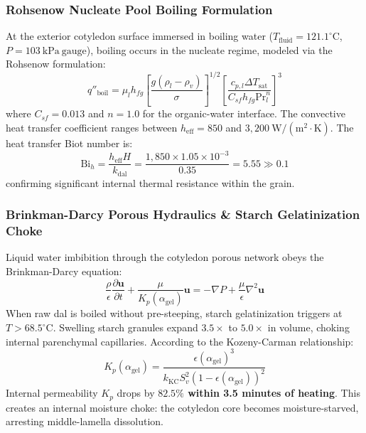 \documentclass[10pt,a4paper]{article}
\begin{document}
\subsubsection{Rohsenow Nucleate Pool Boiling Formulation}
At the exterior cotyledon surface immersed in boiling water ($T_{\mathrm{fluid}} = 121.1^\circ\mathrm{C}$, $P = 103\ \mathrm{kPa\ gauge}$), boiling occurs in the nucleate regime, modeled via the Rohsenow formulation:
\begin{equation}
q''_{\mathrm{boil}} = \mu_l h_{fg} \left[ \frac{g (\rho_l - \rho_v)}{\sigma} \right]^{1/2} \left[ \frac{c_{p,l} \Delta T_{\mathrm{sat}}}{C_{sf} h_{fg} \mathrm{Pr}_l^n} \right]^3
\end{equation}
where $C_{sf} = 0.013$ and $n = 1.0$ for the organic-water interface. The convective heat transfer coefficient ranges between $h_{\mathrm{eff}} = 850$ and $3,200\ \mathrm{W/(m^2 \cdot K)}$. The heat transfer Biot number is:
\begin{equation}
\mathrm{Bi}_h = \frac{h_{\mathrm{eff}} H}{k_{\mathrm{dal}}} = \frac{1,850 \times 1.05 \times 10^{-3}}{0.35} = 5.55 \gg 0.1
\end{equation}
confirming significant internal thermal resistance within the grain.

\subsubsection{Brinkman-Darcy Porous Hydraulics \& Starch Gelatinization Choke}
Liquid water imbibition through the cotyledon porous network obeys the Brinkman-Darcy equation:
\begin{equation}
\frac{\rho}{\epsilon} \frac{\partial \mathbf{u}}{\partial t} + \frac{\mu}{K_p(\alpha_{\mathrm{gel}})} \mathbf{u} = - \nabla P + \frac{\mu}{\epsilon} \nabla^2 \mathbf{u}
\end{equation}
When raw dal is boiled without pre-steeping, starch gelatinization triggers at $T > 68.5^\circ\mathrm{C}$. Swelling starch granules expand $3.5\times$ to $5.0\times$ in volume, choking internal parenchymal capillaries. According to the Kozeny-Carman relationship:
\begin{equation}
K_p(\alpha_{\mathrm{gel}}) = \frac{\epsilon(\alpha_{\mathrm{gel}})^3}{k_{\mathrm{KC}} S_v^2 (1 - \epsilon(\alpha_{\mathrm{gel}}))^2}
\end{equation}
Internal permeability $K_p$ drops by \textbf{$82.5\%$ within 3.5 minutes of heating}. This creates an internal moisture choke: the cotyledon core becomes moisture-starved, arresting middle-lamella dissolution.
\end{document}
